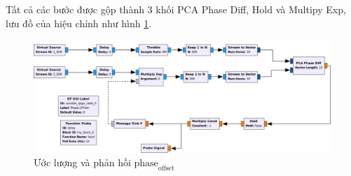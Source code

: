 Tất cả các bước được gộp thành 3 khối PCA Phase Diff, Hold và Multipy Exp, lưu đồ của hiệu chỉnh như hình \ref{fig:phasediff}.

\begin{figure} [!ht]
	\centering
	\includegraphics[width=1\linewidth]{figures/phasediff.png}
	\caption{Ước lượng và phản hồi $\textrm{phase}_\textrm{offset}$}
	\label{fig:phasediff}
\end{figure}

